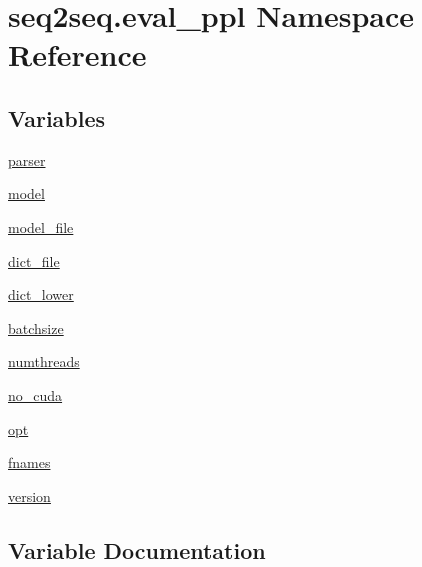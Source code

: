 \hypertarget{namespaceseq2seq_1_1eval__ppl}{}\section{seq2seq.\+eval\+\_\+ppl Namespace Reference}
\label{namespaceseq2seq_1_1eval__ppl}
\subsection*{Variables}
\begin{DoxyCompactItemize}
\item 
\hyperlink{namespaceseq2seq_1_1eval__ppl_af74afb56980c3fda3ba6bba37ef8605c}{parser}
\item 
\hyperlink{namespaceseq2seq_1_1eval__ppl_aaea0ca1061913ae2d28319ea665002e6}{model}
\item 
\hyperlink{namespaceseq2seq_1_1eval__ppl_a9e46e9143b30416b473c86c8bc0bec07}{model\+\_\+file}
\item 
\hyperlink{namespaceseq2seq_1_1eval__ppl_a8e51dc79b933db93477b074202a513c2}{dict\+\_\+file}
\item 
\hyperlink{namespaceseq2seq_1_1eval__ppl_a041fa6e6c360c4c134d4e42ea6c93a0f}{dict\+\_\+lower}
\item 
\hyperlink{namespaceseq2seq_1_1eval__ppl_ac64d8763465c6eaddd9237798248387d}{batchsize}
\item 
\hyperlink{namespaceseq2seq_1_1eval__ppl_a57fedbf067c41a56463cf132c8a1a7ea}{numthreads}
\item 
\hyperlink{namespaceseq2seq_1_1eval__ppl_aa138bc9c8f151713a9e70350763b081f}{no\+\_\+cuda}
\item 
\hyperlink{namespaceseq2seq_1_1eval__ppl_ac9aef8e1b7b3bdebb8796c357f2b106d}{opt}
\item 
\hyperlink{namespaceseq2seq_1_1eval__ppl_acfe94383616d9824aa2f479f2cd9dc8d}{fnames}
\item 
\hyperlink{namespaceseq2seq_1_1eval__ppl_a5ce98aa272398ba396f59de6da776cbe}{version}
\end{DoxyCompactItemize}


\subsection{Variable Documentation}
\mbox{\label{namespaceseq2seq_1_1eval__ppl_ac64d8763465c6eaddd9237798248387d}} 
